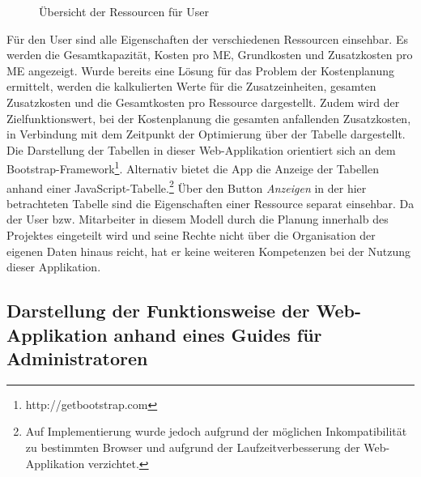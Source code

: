\documentclass[a4paper,12pt,parskip,bibtotoc,liststotoc]{article}
\begin{document}
\begin{figure}[h!]
  \begin{center}
    \caption{Übersicht der Ressourcen für User}  \label{ResUs}
  \end{center}
\end{figure}

Für den User sind alle Eigenschaften der verschiedenen Ressourcen einsehbar. Es werden die Gesamtkapazität, Kosten pro ME, Grundkosten und Zusatzkosten pro ME angezeigt. Wurde bereits eine Lösung für das Problem der Kostenplanung ermittelt, werden die kalkulierten Werte für die Zusatzeinheiten, gesamten Zusatzkosten und die Gesamtkosten pro Ressource dargestellt. Zudem wird der Zielfunktionswert, bei der Kostenplanung die gesamten anfallenden Zusatzkosten, in Verbindung mit dem Zeitpunkt der Optimierung über der Tabelle dargestellt. Die Darstellung der Tabellen in dieser Web-Applikation orientiert sich an dem Bootstrap-Framework\footnote{http://getbootstrap.com}. Alternativ bietet die App die Anzeige der Tabellen anhand einer JavaScript-Tabelle.\footnote{Auf Implementierung wurde jedoch aufgrund der möglichen Inkompatibilität zu bestimmten Browser und aufgrund der Laufzeitverbesserung der Web-Applikation verzichtet.} Über den Button \textit{Anzeigen} in der hier betrachteten Tabelle sind die Eigenschaften einer Ressource separat einsehbar. Da der User bzw. Mitarbeiter in diesem Modell durch die Planung innerhalb des Projektes eingeteilt wird und seine Rechte nicht über die Organisation der eigenen Daten hinaus reicht, hat er keine weiteren Kompetenzen bei der Nutzung dieser Applikation. \\

\subsection{Darstellung der Funktionsweise der Web-Applikation anhand eines Guides für Administratoren}\label{Admins}
\end{document}
